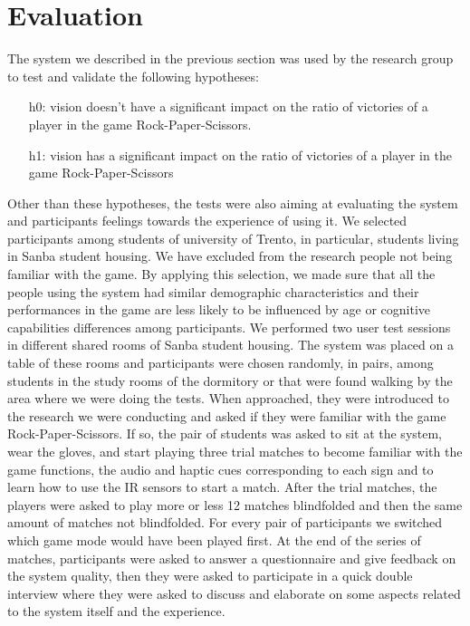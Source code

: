 \documentclass[11pt,a4paper]{report}
\begin{document}
\section*{Evaluation}
The system we described in the previous section was used by the research group to test and validate the following hypotheses:
\begin{itemize}
  \item [h0:] vision doesn’t have a significant impact on the ratio of victories of a player in the game Rock-Paper-Scissors.
  \item [h1:] vision has a significant impact on the ratio of victories of a player in the game Rock-Paper-Scissors
\end{itemize}

\noindent Other than these hypotheses, the tests were also aiming at evaluating the system and participants feelings towards the experience of using it.
We selected participants among students of university of Trento, in particular, students living in Sanba student housing. We have excluded from the research people not being familiar with the game. By applying this selection, we made sure that all the people using the system had similar demographic characteristics and their performances in the game are less likely to be influenced by age or cognitive capabilities differences among participants. 
We performed two user test sessions in different shared rooms of Sanba student housing. The system was placed on a table of these rooms and participants were chosen randomly, in pairs, among students in the study rooms of the dormitory or that were found walking by the area where we were doing the tests. When approached, they were introduced to the research we were conducting and asked if they were familiar with the game Rock-Paper-Scissors. If so, the pair of students was asked to sit at the system, wear the gloves, and start playing three trial matches to become familiar with the game functions, the audio and haptic cues corresponding to each sign and to learn how to use the IR sensors to start a match. After the trial matches, the players were asked to play more or less 12 matches blindfolded and then the same amount of matches not blindfolded. For every pair of participants we switched which game mode would have been played first. At the end of the series of matches, participants were asked to answer a questionnaire and give feedback on the system quality, then they were asked to participate in a quick double interview where they were asked to discuss and elaborate on some aspects related to the system itself and the experience.
\end{document}
